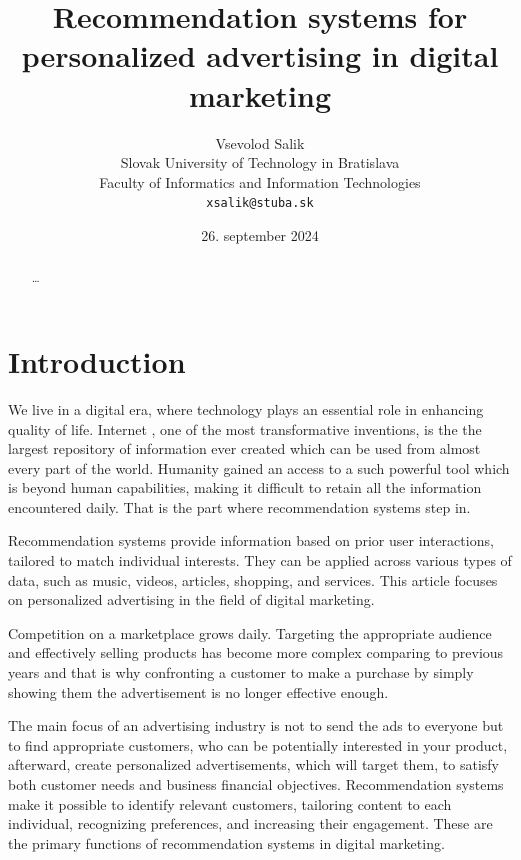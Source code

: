 \documentclass[10pt,twoside,english,a4paper]{article}
\title{Recommendation systems for personalized advertising in digital marketing} %
\author{Vsevolod Salik\\[2pt]
	{\small Slovak University of Technology in Bratislava }\\
	{\small Faculty of Informatics and Information Technologies }\\
	{\small \texttt{xsalik@stuba.sk}}
	}
\date{\small 26. september 2024}
\begin{document}
\maketitle



\begin{abstract}
\ldots
\end{abstract}



\section{Introduction}
We live in a digital era, where technology plays an essential role in enhancing quality of life. Internet , one of the most transformative inventions, is the the largest repository of information ever created which can be used from almost every part of the world. Humanity gained an access to a such powerful tool which is beyond human capabilities, making it difficult to retain all the information encountered daily. That is the part where recommendation systems step in.

\medskip Recommendation systems provide information based on prior user interactions, tailored to match individual interests. They can be applied across various types of data, such as music, videos, articles, shopping, and services. This article focuses on personalized advertising in the field of digital marketing.

\medskip Competition on a marketplace grows daily. Targeting the appropriate audience and effectively selling products has become more complex comparing to previous years and that is why confronting a customer to make a purchase by simply showing them the advertisement is no longer effective enough. 

\medskip The main focus of an advertising industry is not to send the ads to everyone but to find appropriate customers, who can be potentially interested in your product, afterward, create personalized advertisements, which will target them, to satisfy both customer needs and business financial objectives. Recommendation systems make it possible to identify relevant customers, tailoring content to each individual, recognizing preferences, and increasing their engagement. These are the primary functions of recommendation systems in digital marketing.
\end{document}
